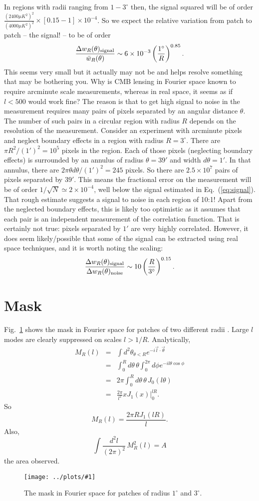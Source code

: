 \documentclass[prd,amsmath,amssymb,floatfix,superscriptaddress,nofootinbib]{revtex4-1}
\def\be{\begin{equation}}
\def\ee{\end{equation}}
\def\bea{\begin{eqnarray}}
\def\eea{\end{eqnarray}}
\newcommand{\vs}{\nonumber\\}
\newcommand{\ec}[1]{Eq.~(\ref{eq:#1})}
\newcommand{\eql}[1]{\label{eq:#1}}
\newcommand{\rf}[1]{\ref{fig:#1}}
\newcommand{\sfigg}[2]{
\texttt{[image: ../plots/\#1]}
        }
\newcommand{\Spng}[2]{
   \begin{figure}[thbp]
   \begin{center}
    \sfigg{../plots/#1.png}{.7\columnwidth}
    \caption{{\small #2}}
    \label{fig:#1}
     \end{center}
   \end{figure}
}
\begin{document}
In regions with radii ranging from $1-3^\circ$ then, the signal squared will be of order $\frac{(2400 \mu K^2)^2}{(4000 \mu K^2)^2}\times [0.15-1]\times 10^{-4}$.  So we expect the relative variation from patch to patch -- the signal! -- to be of order
\be
\frac{\Delta w_R(\theta)_{\rm signal}}{\bar w_R(\theta)} \sim 6\times 10^{-3} \left(\frac{1^\circ}{R}\right)^{0.85}.\eql{signal}\ee
This seems very small but it actually may not be and helps resolve something that may be bothering you. Why is CMB lensing in Fourier space known to require arcminute scale measurements, whereas in real space, it seems as if $l<500$ would work fine? The reason is that to get high signal to noise in the measurement requires many pairs of pixels separated by an angular distance $\theta$. The number of such pairs in a circular region with radius $R$ depends on the resolution of the measurement. Consider an experiment with arcminute pixels and neglect boundary effects in a region with radius $R=3^\circ$. There are $\pi R^2/(1')^2=10^5$ pixels in the region. Each of those pixels (neglecting boundary effects) is surrounded by an annulus  of radius $\theta=39'$ and width $d\theta=1'$. In that annulus, there are $2\pi \theta d\theta/(1')^2=245$ pixels. So there are $2.5\times 10^7$ pairs of pixels separated by $39'$. This means the fractional error on the measurement will be of order $1/\sqrt{N}\simeq 2\times 10^{-4}$, well below the signal estimated in \ec{signal}. That rough estimate suggests a signal to noise in each region of 10:1! Apart from the neglected boundary effects, this is likely too optimistic as it assumes that each pair is an independent measurement of the correlation function. That is certainly not true: pixels separated by $1'$ are very highly correlated. However, it does seem likely/possible that some of the signal can be extracted using real space techniques, and it is worth noting the scaling:
\be
\frac{\Delta w_R(\theta)_{\rm signal}}{\Delta w_R(\theta)_{\rm noise}} \sim 10 \left( \frac{R}{3^\circ} \right)^{0.15}.\ee

\appendix
\section{Mask}
Fig.~\rf{mask} shows the mask in Fourier space for patches of two different radii . Large $l$ modes are clearly suppressed on scales $l>1/R$. Analytically,
\bea
M_R(l) &=& \int d^2\theta_{\theta<R} e^{-i\vec l\cdot\vec\theta} 
\vs
&=&
\int_0^R d\theta\,\theta \int_0^{2\pi} d\phi e^{-il\theta\cos\phi}
\vs
&=&
2\pi \int_0^R d\theta\,\theta\,J_0(l\theta)
\vs
&=&
\frac{2\pi}{l^2} xJ_1(x)\bigg\vert^{lR}_0.
\eea
So
\be
M_R(l) = \frac{2\pi R J_1(lR)}{l}.\ee
Also,
\be
\int \frac{d^2l}{(2\pi)^2} \, M_R^2(l) =A\ee
the area observed.
\Spng{mask}{The mask in Fourier space for patches of radius $1^\circ$ and $3^\circ$.}
\end{document}
